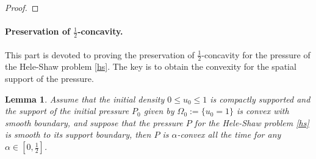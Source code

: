 \documentclass[10pt]{article}         %
\newtheorem{lemma}{Lemma}[section]
\numberwithin{equation}{section}
\begin{document}
\begin{proof}
\end{proof}


\paragraph{Preservation of $\frac{1}{2}$-concavity.} This part is devoted to proving the preservation of $\frac{1}{2}$-concavity for the pressure of the Hele-Shaw problem \eqref{hs}. The key is to obtain the convexity for the spatial support of the pressure.
\begin{lemma}Assume that the initial density $0\leq u_0\leq 1$ is compactly supported and  the support of the initial pressure $P_0$ given by $\Omega_{0}:=\{u_0=1\}$ is convex with smooth boundary, and suppose that the pressure $P$ for the Hele-Shaw problem \eqref{hs} is smooth to its support boundary, then $P$ is $\alpha$-convex all the time for any  $\alpha\in[0,\frac{1}{2}]$. 
\end{lemma}
\end{document}
